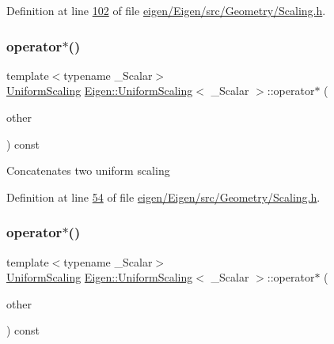 Definition at line \hyperlink{eigen_2_eigen_2src_2_geometry_2_scaling_8h_source_l00102}{102} of file \hyperlink{eigen_2_eigen_2src_2_geometry_2_scaling_8h_source}{eigen/\+Eigen/src/\+Geometry/\+Scaling.\+h}.

\mbox{\label{class_eigen_1_1_uniform_scaling_af3044cffe5703a1946c33a953b0f9bb6}} 
\subsubsection{\texorpdfstring{operator$\ast$()}{operator*()}\hspace{0.1cm}{\footnotesize\ttfamily [1/8]}}
{\footnotesize\ttfamily template$<$typename \+\_\+\+Scalar$>$ \\
\hyperlink{class_eigen_1_1_uniform_scaling}{Uniform\+Scaling} \hyperlink{class_eigen_1_1_uniform_scaling}{Eigen\+::\+Uniform\+Scaling}$<$ \+\_\+\+Scalar $>$\+::operator$\ast$ (\begin{DoxyParamCaption}\item[{const \hyperlink{class_eigen_1_1_uniform_scaling}{Uniform\+Scaling}$<$ \+\_\+\+Scalar $>$ \&}]{other }\end{DoxyParamCaption}) const\hspace{0.3cm}{\ttfamily [inline]}}

Concatenates two uniform scaling 

Definition at line \hyperlink{eigen_2_eigen_2src_2_geometry_2_scaling_8h_source_l00054}{54} of file \hyperlink{eigen_2_eigen_2src_2_geometry_2_scaling_8h_source}{eigen/\+Eigen/src/\+Geometry/\+Scaling.\+h}.

\mbox{\label{class_eigen_1_1_uniform_scaling_af3044cffe5703a1946c33a953b0f9bb6}} 
\subsubsection{\texorpdfstring{operator$\ast$()}{operator*()}\hspace{0.1cm}{\footnotesize\ttfamily [2/8]}}
{\footnotesize\ttfamily template$<$typename \+\_\+\+Scalar$>$ \\
\hyperlink{class_eigen_1_1_uniform_scaling}{Uniform\+Scaling} \hyperlink{class_eigen_1_1_uniform_scaling}{Eigen\+::\+Uniform\+Scaling}$<$ \+\_\+\+Scalar $>$\+::operator$\ast$ (\begin{DoxyParamCaption}\item[{const \hyperlink{class_eigen_1_1_uniform_scaling}{Uniform\+Scaling}$<$ \+\_\+\+Scalar $>$ \&}]{other }\end{DoxyParamCaption}) const\hspace{0.3cm}{\ttfamily [inline]}}

